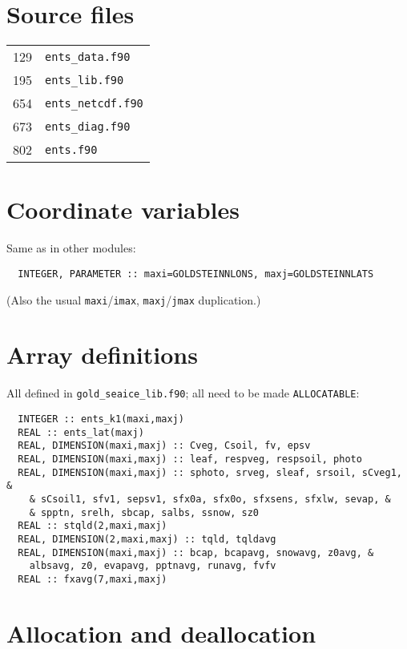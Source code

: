 \documentclass[a4paper,10pt,article]{memoir}
\begin{document}
\section{Source files}

\begin{tabular}{rl}
  129 & \texttt{ents\_data.f90} \\
  195 & \texttt{ents\_lib.f90} \\
  654 & \texttt{ents\_netcdf.f90} \\
  673 & \texttt{ents\_diag.f90} \\
  802 & \texttt{ents.f90} \\
\end{tabular}

\section{Coordinate variables}

Same as in other modules:

\begin{verbatim}
  INTEGER, PARAMETER :: maxi=GOLDSTEINNLONS, maxj=GOLDSTEINNLATS
\end{verbatim}

(Also the usual \texttt{maxi}/\texttt{imax},
\texttt{maxj}/\texttt{jmax} duplication.)

\section{Array definitions}

All defined in \texttt{gold\_seaice\_lib.f90}; all need to be made
\texttt{ALLOCATABLE}:

\begin{verbatim}
  INTEGER :: ents_k1(maxi,maxj)
  REAL :: ents_lat(maxj)
  REAL, DIMENSION(maxi,maxj) :: Cveg, Csoil, fv, epsv
  REAL, DIMENSION(maxi,maxj) :: leaf, respveg, respsoil, photo
  REAL, DIMENSION(maxi,maxj) :: sphoto, srveg, sleaf, srsoil, sCveg1, &
    & sCsoil1, sfv1, sepsv1, sfx0a, sfx0o, sfxsens, sfxlw, sevap, &
    & spptn, srelh, sbcap, salbs, ssnow, sz0
  REAL :: stqld(2,maxi,maxj)
  REAL, DIMENSION(2,maxi,maxj) :: tqld, tqldavg
  REAL, DIMENSION(maxi,maxj) :: bcap, bcapavg, snowavg, z0avg, &
    albsavg, z0, evapavg, pptnavg, runavg, fvfv
  REAL :: fxavg(7,maxi,maxj)
\end{verbatim}

\section{Allocation and deallocation}
\end{document}

